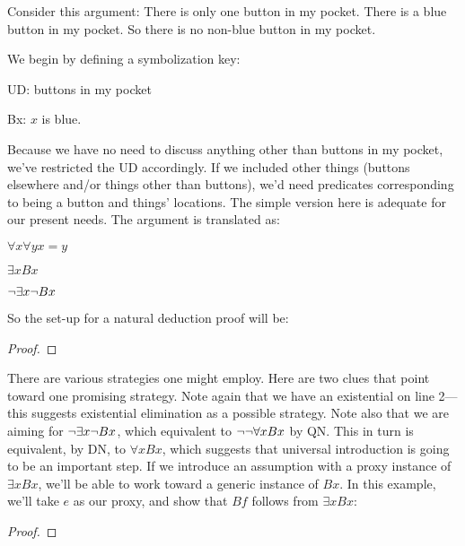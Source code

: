 Consider this argument: There is only one button in my pocket. There is a blue button in my pocket. So there is no non-blue button in my pocket.

We begin by defining a symbolization key:
\begin{ekey}
\item{UD:} buttons in my pocket
\item{Bx:} $x$ is blue.
\end{ekey}
Because we have no need to discuss anything other than buttons in my pocket, we've restricted the UD accordingly. If we included other things (buttons elsewhere and/or things other than buttons), we'd need predicates corresponding to being a button and things' locations. The simple version here is adequate for our present needs. The argument is translated as:
\begin{earg}
\item{} $\forall x \forall y x{=}y$
\item{} $\exists x Bx$
\item{\therefore} $\neg \exists x \neg Bx$
\end{earg}

So the set-up for a natural deduction proof will be:

\begin{proof}
	 
	\have{}{}{}
\end{proof}

There are various strategies one might employ. Here are two clues that point toward one promising strategy. Note again that we have an existential on line 2--- this suggests existential elimination as a possible strategy. Note also that we are aiming for $\neg \exists x \neg Bx$, which equivalent to $\neg \neg \forall x Bx$ by QN. This in turn is equivalent, by DN, to $\forall x Bx$, which suggests that universal introduction is going to be an important step. If we introduce an assumption with a proxy instance of $\exists x Bx$, we'll be able to work toward a generic instance of $Bx$. In this example, we'll take $e$ as our proxy, and show that $Bf$ follows from $\exists x Bx$:

\begin{proof}
	 
	\open
	\close
\end{proof}

